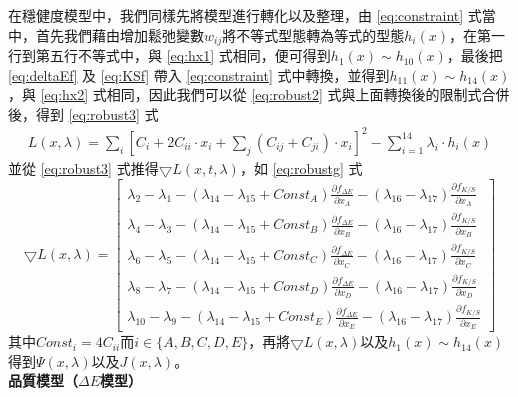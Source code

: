 在穩健度模型中，我們同樣先將模型進行轉化以及整理，由 \ref{eq:constraint} 式當中，首先我們藉由增加鬆弛變數$w_{ij}$將不等式型態轉為等式的型態$h_{i}(x)$，在第一行到第五行不等式中，與 \ref{eq:hx1} 式相同，便可得到$h_{1}(x) \sim h_{10}(x)$，最後把 \ref{eq:deltaEf} 及 \ref{eq:KSf} 帶入 \ref{eq:constraint} 式中轉換，並得到$h_{11}(x) \sim h_{14}(x)$，與 \ref{eq:hx2} 式相同，因此我們可以從 \ref{eq:robust2} 式與上面轉換後的限制式合併後，得到 \ref{eq:robust3} 式
\begin{equation}
	\begin{split}
	L(x,\lambda)=\sum_{i}[C_{i}+2C_{ii}\cdot x_i+\sum_j(C_{ij}+C_{ji})\cdot x_i]^{2}-\sum_{i=1}^{14} \lambda_{i}\cdot h_{i}(x)
	\end{split}
\label{eq:robust3}
\end{equation}
並從 \ref{eq:robust3} 式推得$\bigtriangledown L(x,t,\lambda)$，如 \ref{eq:robustg} 式 \newpage
\begin{equation}
\bigtriangledown L(x,\lambda)=\left[ 
	\begin{array}{c}
	\lambda_{2}-\lambda_{1}-(\lambda_{14}-\lambda_{15}+Const_{A}) \frac{\partial f_{\Delta E}}{\partial x_{A}}-(\lambda_{16}-\lambda_{17}) \frac{\partial f_{K/S}}{\partial x_{A}} \\

	\lambda_{4}-\lambda_{3}-(\lambda_{14}-\lambda_{15}+Const_{B}) \frac{\partial f_{\Delta E}}{\partial x_{B}}-(\lambda_{16}-\lambda_{17}) \frac{\partial f_{K/S}}{\partial x_{B}} \\

	\lambda_{6}-\lambda_{5}-(\lambda_{14}-\lambda_{15}+Const_{C}) \frac{\partial f_{\Delta E}}{\partial x_{C}}-(\lambda_{16}-\lambda_{17}) \frac{\partial f_{K/S}}{\partial x_{C}} \\

	\lambda_{8}-\lambda_{7}-(\lambda_{14}-\lambda_{15}+Const_{D}) \frac{\partial f_{\Delta E}}{\partial x_{D}}-(\lambda_{16}-\lambda_{17}) \frac{\partial f_{K/S}}{\partial x_{D}} \\

	\lambda_{10}-\lambda_{9}-(\lambda_{14}-\lambda_{15}+Const_{E}) \frac{\partial f_{\Delta E}}{\partial x_{E}}-(\lambda_{16}-\lambda_{17}) \frac{\partial f_{K/S}}{\partial x_{E}} 
	\end{array}
	\right]
\label{eq:robustg}
\end{equation}
其中$Const_{i}=4C_{ii}$而$i\in \{A,B,C,D,E\}$，再將$\bigtriangledown L(x,\lambda)$以及$h_{1}(x)\sim h_{14}(x)$得到$\Psi(x,\lambda)$以及$J(x,\lambda)$。
\\\textbf{品質模型（$\Delta E$模型）}

